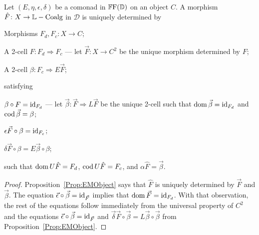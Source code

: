 \begin{lemma}
	Let $(E,\eta,\epsilon,\delta)$ be a comonad in $\mathbb{F}\mathrm{F}(\mathbb{D})$ on an object $C$. A morphism $\hat{F}\colon X\to \mathbb{L}-\mathrm{Coalg}$ in $\mathcal{D}$ is uniquely determined by
	\begin{compactitem}
		\item Morphisms $F_d,F_c\colon X\to C$;
		\item A 2-cell $F\colon F_d\Rightarrow F_c$ --- let $\vec{F}\colon X\to C^2$ be the unique morphism determined by $F$;
		\item A 2-cell $\beta\colon F_c\Rightarrow E\vec{F}$;
	\end{compactitem}
	satisfying
	\begin{compactenum}
		\item $\beta\circ F=\operatorname{id}_{F_d}$ --- let $\vec{\beta}\colon\vec{F}\Rightarrow L\vec{F}$ be the unique 2-cell such that $\operatorname{dom}\vec{\beta}=\operatorname{id}_{F_d}$ and $\operatorname{cod}\vec{\beta}=\beta$;
		\item $\epsilon\vec{F}\circ\beta = \operatorname{id}_{F_c}$;
		\item $\delta\vec{F}\circ\beta = E\vec{\beta}\circ\beta$;
	\end{compactenum}
	such that $\operatorname{dom} U\hat{F}=F_d$, $\operatorname{cod} U\hat{F}=F_c$, and $\alpha\hat{F}=\vec{\beta}$.
\end{lemma}
\begin{proof}
	Proposition~\ref{Prop:EMObject} says that $\hat{F}$ is uniquely determined by $\vec{F}$ and $\vec{\beta}$. The equation $\vec{\epsilon}\circ\vec{\beta}=\operatorname{id}_{\vec{F}}$ implies that $\operatorname{dom}\vec{F}=\operatorname{id}_{F_d}$. With that observation, the rest of the equations follow immediately from the universal property of $C^2$ and the equations $\vec{\epsilon}\circ\vec{\beta}=\operatorname{id}_{\vec{F}}$ and $\vec{\delta}\vec{F}\circ\vec{\beta} = L\vec{\beta}\circ\vec{\beta}$ from Proposition~\ref{Prop:EMObject}.
\end{proof}